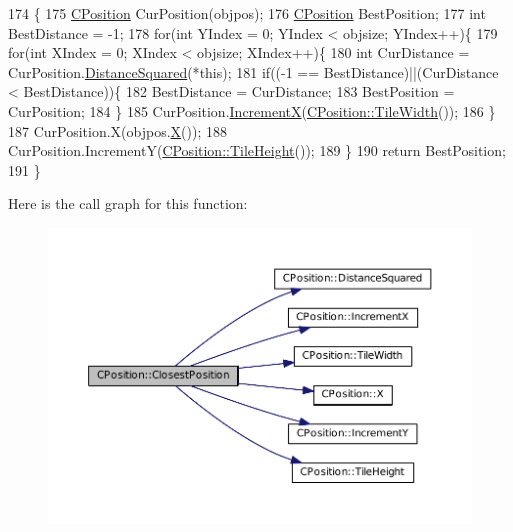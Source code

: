 \begin{DoxyCode}
174                                                                               \{
175     \hyperlink{classCPosition}{CPosition} CurPosition(objpos);
176     \hyperlink{classCPosition}{CPosition} BestPosition;
177     \textcolor{keywordtype}{int} BestDistance = -1;
178     \textcolor{keywordflow}{for}(\textcolor{keywordtype}{int} YIndex = 0; YIndex < objsize; YIndex++)\{
179         \textcolor{keywordflow}{for}(\textcolor{keywordtype}{int} XIndex = 0; XIndex < objsize; XIndex++)\{
180             \textcolor{keywordtype}{int} CurDistance = CurPosition.\hyperlink{classCPosition_acd96d507f44c0fdf13036ebc1a09e59c}{DistanceSquared}(*\textcolor{keyword}{this});
181             \textcolor{keywordflow}{if}((-1 == BestDistance)||(CurDistance < BestDistance))\{
182                 BestDistance = CurDistance;
183                 BestPosition = CurPosition;
184             \}
185             CurPosition.\hyperlink{classCPosition_aa5955d67d5ab7ca74d80cb7303b6eaa9}{IncrementX}(\hyperlink{classCPosition_a27a7a8b9a5541da0aa8d97d785650fb8}{CPosition::TileWidth}());
186         \}
187         CurPosition.X(objpos.\hyperlink{classCPosition_a9a6b94d3b91df1492d166d9964c865fc}{X}());
188         CurPosition.IncrementY(\hyperlink{classCPosition_ac4f0edd9c9632f1bdca981ef5d9b71e5}{CPosition::TileHeight}());
189     \}
190     \textcolor{keywordflow}{return} BestPosition;
191 \}
\end{DoxyCode}
Here is the call graph for this function\+:\nopagebreak
\begin{figure}[H]
\begin{center}
\leavevmode
\includegraphics[width=350pt]{classCPosition_a91fd43eeb2c894bcb7577ae87247b726_cgraph}
\end{center}
\end{figure}
